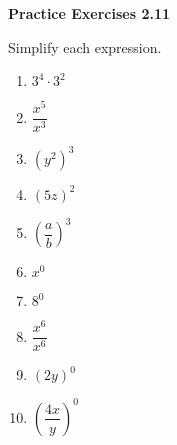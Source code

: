 \vspace{1ex}
\noindent\textbf{Practice Exercises 2.11}

\vspace{0.75ex}

Simplify each expression.

\begin{multicols}{2}
\begin{enumerate}[noitemsep, label = \color{blue}\arabic*. ]
    \item \( 3^4 \cdot 3^2 \)
    \item \( \dfrac{x^5}{x^3} \)
    \item \( (y^2)^3 \)
    \item \( (5z)^2 \)
    \item \( \left( \dfrac{a}{b} \right)^3 \)
    \item \( x^0 \)
    \item \( 8^0 \)
    \item \( \dfrac{x^6}{x^6} \)
    \item \( (2y)^0 \)
    \item \( \left( \dfrac{4x}{y} \right)^0 \)
\end{enumerate}
\end{multicols}

